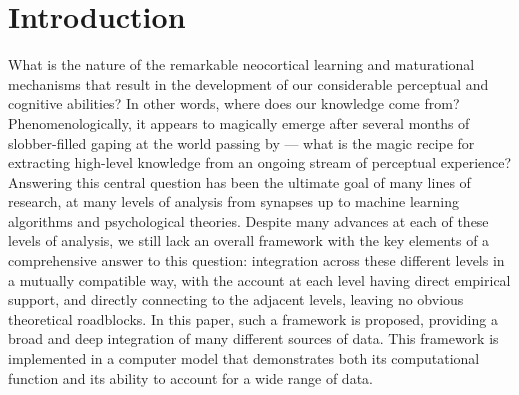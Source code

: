 \documentclass[11pt,twoside]{article}
\newif\myifpdf
\begin{document}
\titlesepage{\mytitle}{\myauthor}{\mynote}{\myabstract}





\pagestyle{myheadings}



\section{Introduction}

What is the nature of the remarkable neocortical learning and maturational mechanisms that result in the development of our considerable perceptual and cognitive abilities?  In other words, where does our knowledge come from?  Phenomenologically, it appears to magically emerge after several months of slobber-filled gaping at the world passing by --- what is the magic recipe for extracting high-level knowledge from an ongoing stream of perceptual experience?  Answering this central question has been the ultimate goal of many lines of research, at many levels of analysis from synapses up to machine learning algorithms and psychological theories.  Despite many advances at each of these levels of analysis, we still lack an overall framework with the key elements of a comprehensive answer to this question: integration across these different levels in a mutually compatible way, with the account at each level having direct empirical support, and directly connecting to the adjacent levels, leaving no obvious theoretical roadblocks.  In this paper, such a framework is proposed, providing a broad and deep integration of many different sources of data.  This framework is implemented in a computer model that demonstrates both its computational function and its ability to account for a wide range of data.  
\end{document}
